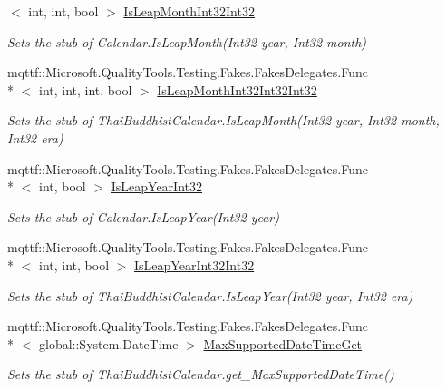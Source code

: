 \begin{DoxyCompactItemize}
$<$ int, int, bool $>$ \hyperlink{class_system_1_1_globalization_1_1_fakes_1_1_stub_thai_buddhist_calendar_aaf1d5d5983be7849673c4f4674f1fd84}{Is\-Leap\-Month\-Int32\-Int32}
\begin{DoxyCompactList}\small\item\em Sets the stub of Calendar.\-Is\-Leap\-Month(\-Int32 year, Int32 month)\end{DoxyCompactList}\item 
mqttf\-::\-Microsoft.\-Quality\-Tools.\-Testing.\-Fakes.\-Fakes\-Delegates.\-Func\\*
$<$ int, int, int, bool $>$ \hyperlink{class_system_1_1_globalization_1_1_fakes_1_1_stub_thai_buddhist_calendar_adee70aee2aa5474b3549e1724683bc03}{Is\-Leap\-Month\-Int32\-Int32\-Int32}
\begin{DoxyCompactList}\small\item\em Sets the stub of Thai\-Buddhist\-Calendar.\-Is\-Leap\-Month(\-Int32 year, Int32 month, Int32 era)\end{DoxyCompactList}\item 
mqttf\-::\-Microsoft.\-Quality\-Tools.\-Testing.\-Fakes.\-Fakes\-Delegates.\-Func\\*
$<$ int, bool $>$ \hyperlink{class_system_1_1_globalization_1_1_fakes_1_1_stub_thai_buddhist_calendar_a93c8706097c5abb5438d6a90055fa937}{Is\-Leap\-Year\-Int32}
\begin{DoxyCompactList}\small\item\em Sets the stub of Calendar.\-Is\-Leap\-Year(\-Int32 year)\end{DoxyCompactList}\item 
mqttf\-::\-Microsoft.\-Quality\-Tools.\-Testing.\-Fakes.\-Fakes\-Delegates.\-Func\\*
$<$ int, int, bool $>$ \hyperlink{class_system_1_1_globalization_1_1_fakes_1_1_stub_thai_buddhist_calendar_a8163150d0e0e464392534b8aacd0bad1}{Is\-Leap\-Year\-Int32\-Int32}
\begin{DoxyCompactList}\small\item\em Sets the stub of Thai\-Buddhist\-Calendar.\-Is\-Leap\-Year(\-Int32 year, Int32 era)\end{DoxyCompactList}\item 
mqttf\-::\-Microsoft.\-Quality\-Tools.\-Testing.\-Fakes.\-Fakes\-Delegates.\-Func\\*
$<$ global\-::\-System.\-Date\-Time $>$ \hyperlink{class_system_1_1_globalization_1_1_fakes_1_1_stub_thai_buddhist_calendar_af7cc8eac819bd19688541596814efbc3}{Max\-Supported\-Date\-Time\-Get}
\begin{DoxyCompactList}\small\item\em Sets the stub of Thai\-Buddhist\-Calendar.\-get\-\_\-\-Max\-Supported\-Date\-Time()\end{DoxyCompactList}\item 

\end{DoxyCompactItemize}
